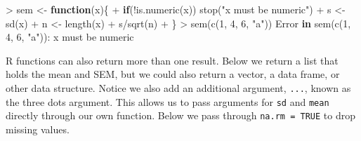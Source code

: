 \documentclass[
]{book}
\newenvironment{Shaded}{\begin{snugshade}}{\end{snugshade}}
\newcommand{\ControlFlowTok}[1]{\textcolor[rgb]{0.13,0.29,0.53}{\textbf{#1}}}
\newcommand{\DecValTok}[1]{\textcolor[rgb]{0.00,0.00,0.81}{#1}}
\newcommand{\FunctionTok}[1]{\textcolor[rgb]{0.00,0.00,0.00}{#1}}
\newcommand{\NormalTok}[1]{#1}
\newcommand{\OtherTok}[1]{\textcolor[rgb]{0.56,0.35,0.01}{#1}}
\newcommand{\SpecialCharTok}[1]{\textcolor[rgb]{0.00,0.00,0.00}{#1}}
\newcommand{\StringTok}[1]{\textcolor[rgb]{0.31,0.60,0.02}{#1}}
\begin{document}
\begin{Shaded}
\begin{Highlighting}[]
\SpecialCharTok{\textgreater{}}\NormalTok{ sem }\OtherTok{\textless{}{-}} \ControlFlowTok{function}\NormalTok{(x)\{}
\SpecialCharTok{+}   \ControlFlowTok{if}\NormalTok{(}\SpecialCharTok{!}\FunctionTok{is.numeric}\NormalTok{(x)) }\FunctionTok{stop}\NormalTok{(}\StringTok{"x must be numeric"}\NormalTok{)}
\SpecialCharTok{+}\NormalTok{   s }\OtherTok{\textless{}{-}} \FunctionTok{sd}\NormalTok{(x)}
\SpecialCharTok{+}\NormalTok{   n }\OtherTok{\textless{}{-}} \FunctionTok{length}\NormalTok{(x)}
\SpecialCharTok{+}\NormalTok{   s}\SpecialCharTok{/}\FunctionTok{sqrt}\NormalTok{(n)}
\SpecialCharTok{+}\NormalTok{ \}}
\SpecialCharTok{\textgreater{}} \FunctionTok{sem}\NormalTok{(}\FunctionTok{c}\NormalTok{(}\DecValTok{1}\NormalTok{, }\DecValTok{4}\NormalTok{, }\DecValTok{6}\NormalTok{, }\StringTok{"a"}\NormalTok{))}
\NormalTok{Error }\ControlFlowTok{in} \FunctionTok{sem}\NormalTok{(}\FunctionTok{c}\NormalTok{(}\DecValTok{1}\NormalTok{, }\DecValTok{4}\NormalTok{, }\DecValTok{6}\NormalTok{, }\StringTok{"a"}\NormalTok{))}\SpecialCharTok{:}\NormalTok{ x must be numeric}
\end{Highlighting}
\end{Shaded}

R functions can also return more than one result. Below we return a list that holds the mean and SEM, but we could also return a vector, a data frame, or other data structure. Notice we also add an additional argument, \texttt{...}, known as the three dots argument. This allows us to pass arguments for \texttt{sd} and \texttt{mean} directly through our own function. Below we pass through \texttt{na.rm\ =\ TRUE} to drop missing values.
\end{document}
